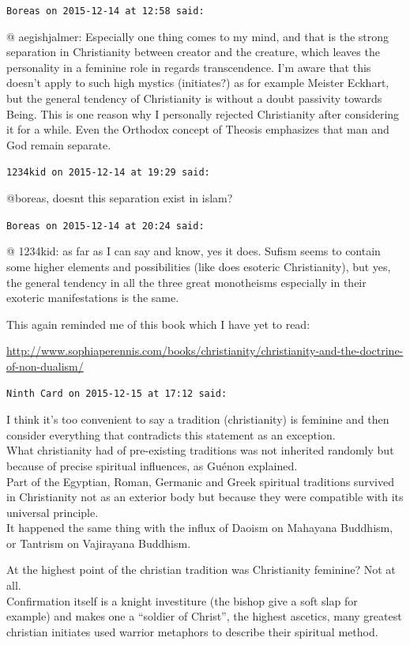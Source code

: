 \begin{footnotesize}
\begin{sffamily}
\hfill

\texttt{Boreas on 2015-12-14 at 12:58 said:}

@ aegishjalmer: Especially one thing comes to my mind, and that is the strong separation in Christianity between creator and the creature, which leaves the personality in a feminine role in regards transcendence. I'm aware that this doesn't apply to such high mystics (initiates?) as for example Meister Eckhart, but the general tendency of Christianity is without a doubt passivity towards Being. This is one reason why I personally rejected Christianity after considering it for a while. Even the Orthodox concept of Theosis emphasizes that man and God remain separate.

\hfill

\texttt{1234kid on 2015-12-14 at 19:29 said:}

@boreas, doesnt this separation exist in islam?


\hfill

\texttt{Boreas on 2015-12-14 at 20:24 said:}

@ 1234kid: as far as I can say and know, yes it does. Sufism seems to contain some higher elements and possibilities (like does esoteric Christianity), but yes, the general tendency in all the three great monotheisms especially in their exoteric manifestations is the same.

This again reminded me of this book which I have yet to read:

\url{http://www.sophiaperennis.com/books/christianity/christianity-and-the-doctrine-of-non-dualism/}


\hfill

\texttt{Ninth Card on 2015-12-15 at 17:12 said:}

I think it's too convenient to say a tradition (christianity) is feminine and then consider everything that contradicts this statement as an exception.\\ What christianity had of pre-existing traditions was not inherited randomly but because of precise spiritual influences, as Guénon explained.\\ Part of the Egyptian, Roman, Germanic and Greek spiritual traditions survived in Christianity not as an exterior body but because they were compatible with its universal principle.\\ It happened the same thing with the influx of Daoism on Mahayana Buddhism, or Tantrism on Vajirayana Buddhism.

At the highest point of the christian tradition was Christianity feminine? Not at all.\\ Confirmation itself is a knight investiture (the bishop give a soft slap for example) and makes one a ``soldier of Christ'', the highest ascetics, many greatest christian initiates used warrior metaphors to describe their spiritual method.


\end{sffamily}
\end{footnotesize}
